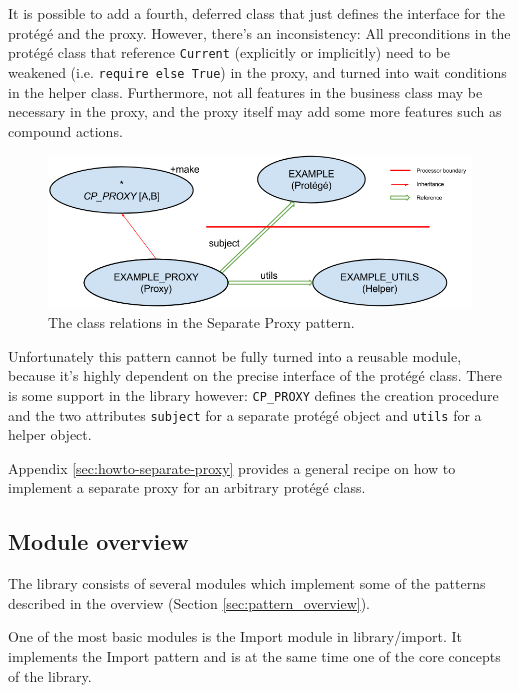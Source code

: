 \documentclass[a4paper,10pt]{article}
\newcommand{\dir} [1] [] {\emph{#1}}
\begin{document}
It is possible to add a fourth, deferred class that just defines the interface for the protégé and the proxy.
However, there's an inconsistency: 
All preconditions in the protégé class that reference \lstinline!Current! (explicitly or implicitly) need to be weakened (i.e. \lstinline!require else True!) in the proxy, and turned into wait conditions in the helper class.
Furthermore, not all features in the business class may be necessary in the proxy, and the proxy itself may add some more features such as compound actions.

\begin{figure}[h]
\label{fig:separate-proxy}
\includegraphics[width=\textwidth]{separate_proxy.png}
\caption{The class relations in the Separate Proxy pattern.}
\end{figure}

Unfortunately this pattern cannot be fully turned into a reusable module, because it's highly dependent on the precise interface of the protégé class.
There is some support in the library however: 
\lstinline!CP_PROXY! defines the creation procedure and the two attributes \lstinline!subject! for a separate protégé object and \lstinline!utils! for a helper object.

Appendix \ref{sec:howto-separate-proxy} provides a general recipe on how to implement a separate proxy for an arbitrary protégé class.

\subsection {Module overview}
\label{sec:module-overview}

The library consists of several modules which implement some of the patterns described in the overview (Section \ref{sec:pattern_overview}).

One of the most basic modules is the Import module in \dir{library/import}.
It implements the Import  pattern  and is at the same time one of the core concepts of the library.
\end{document}
